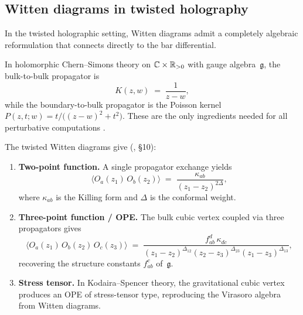 
\subsection{Witten diagrams in twisted holography}

In the twisted holographic setting, Witten diagrams admit a completely
algebraic reformulation that connects directly to the bar differential.

\begin{definition}
In holomorphic Chern--Simons theory on $\mathbb C \times \mathbb R_{>0}$ with gauge
algebra~$\mathfrak{g}$, the bulk-to-bulk propagator is
\begin{equation}%
K(z,w) \;=\; \frac{1}{z - w},
\end{equation}
while the boundary-to-bulk propagator is the Poisson kernel
$P(z,t;w) = t/\bigl((z-w)^2 + t^2\bigr)$. These are the only
ingredients needed for all perturbative computations \cite{CG18}.
\end{definition}

\begin{proposition}
The twisted Witten diagrams give \textup{(}\!\cite{CG18}, \S10\textup{)}:
\begin{enumerate}[label=\textup{(\roman*)}]
\item \textbf{Two-point function.} A single propagator exchange yields
 \begin{equation}%
 \bigl\langle O_a(z_1)\, O_b(z_2) \bigr\rangle
 \;=\;
 \frac{\kappa_{ab}}{(z_1 - z_2)^{2\Delta}},
 \end{equation}
 where $\kappa_{ab}$ is the Killing form and $\Delta$ is the conformal
 weight.
\item \textbf{Three-point function / OPE.} The bulk cubic vertex coupled
 via three propagators gives
 \begin{equation}%
 \bigl\langle O_a(z_1)\, O_b(z_2)\, O_c(z_3) \bigr\rangle
 \;=\;
 \frac{f^{d}_{ab}\,\kappa_{dc}}
 {(z_1 - z_2)^{\Delta_{12}}(z_2 - z_3)^{\Delta_{23}}(z_1 - z_3)^{\Delta_{13}}},
 \end{equation}
 recovering the structure constants $f^c_{ab}$ of~$\mathfrak{g}$.
\item \textbf{Stress tensor.} In Kodaira--Spencer theory, the gravitational
 cubic vertex produces an OPE of stress-tensor type, reproducing the
 Virasoro algebra from Witten diagrams.
\end{enumerate}
\end{proposition}

